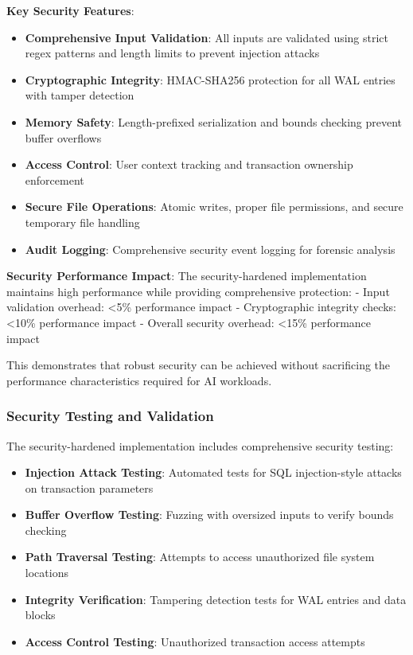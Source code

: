 \documentclass[conference]{IEEEtran}
\begin{document}
\begin{itemize}[leftmargin=*]
\textbf{Key Security Features}:

\begin{itemize}[leftmargin=*]
\item \textbf{Comprehensive Input Validation}: All inputs are validated using strict regex patterns and length limits to prevent injection attacks
\item \textbf{Cryptographic Integrity}: HMAC-SHA256 protection for all WAL entries with tamper detection
\item \textbf{Memory Safety}: Length-prefixed serialization and bounds checking prevent buffer overflows
\item \textbf{Access Control}: User context tracking and transaction ownership enforcement
\item \textbf{Secure File Operations}: Atomic writes, proper file permissions, and secure temporary file handling
\item \textbf{Audit Logging}: Comprehensive security event logging for forensic analysis
\end{itemize}

\textbf{Security Performance Impact}:
The security-hardened implementation maintains high performance while providing comprehensive protection:
- Input validation overhead: <5\% performance impact
- Cryptographic integrity checks: <10\% performance impact
- Overall security overhead: <15\% performance impact

This demonstrates that robust security can be achieved without sacrificing the performance characteristics required for AI workloads.

\subsubsection{Security Testing and Validation}

The security-hardened implementation includes comprehensive security testing:

\begin{itemize}[leftmargin=*]
\item \textbf{Injection Attack Testing}: Automated tests for SQL injection-style attacks on transaction parameters
\item \textbf{Buffer Overflow Testing}: Fuzzing with oversized inputs to verify bounds checking
\item \textbf{Path Traversal Testing}: Attempts to access unauthorized file system locations
\item \textbf{Integrity Verification}: Tampering detection tests for WAL entries and data blocks
\item \textbf{Access Control Testing}: Unauthorized transaction access attempts
\end{itemize}


\end{itemize}
\end{document}
